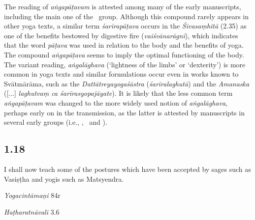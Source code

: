 \begin{ekdosis}
\begin{testimonia}[hp01_017]
\end{testimonia}

\begin{philcomm}[hp01_017]        
The reading of \emph{aṅgapāṭavam} is attested among many of the early manuscripts, including the main one of the \textalpha\ group. Although this compound rarely appears in other yoga texts, a similar term \emph{śarīrapāṭava} occurs in the \emph{Śivasaṃhitā} (2.35) as one of the benefits bestowed by digestive fire (\emph{vaiśvānarāgni}), which indicates that the word \emph{pāṭava} was used in relation to the body and the benefits of yoga. The compound \emph{aṅgapāṭava} seems to imply the optimal functioning of the body. The variant reading, \emph{aṅgalāghava} (‘lightness of the limbs’ or ‘dexterity’) is more common in yoga texts and similar formulations occur even in works known to Svātmārāma, such as the \emph{Dattātreyayogaśāstra} (\emph{śarīralaghutā}) and the \textit{Amanaska} ([...] \emph{laghutvaṃ ca śarīrasyopajāyate}). It is likely that the less common term \emph{aṅgapāṭavam} was changed to the more widely used notion of \emph{aṅgalāghava}, perhaps early on in the transmission, as the latter is attested by manuscripts in several early groups (i.e., \textbeta, \textgamma\ and \textdelta).
\end{philcomm}

\subsection*{1.18}
\begin{translation}[hp01_018]
I shall now teach some of the postures which have been accepted by sages  such as Vasiṣṭha and yogis such as Matsyendra.
\end{translation}

\begin{testimonia}[hp01_018]
\emph{Yogacintāmaṇi} 84r

\begin{versinnote}
\end{versinnote}

\emph{Haṭharatnāvalī} 3.6

\begin{versinnote}
\end{versinnote}


\end{testimonia}
\end{ekdosis}
